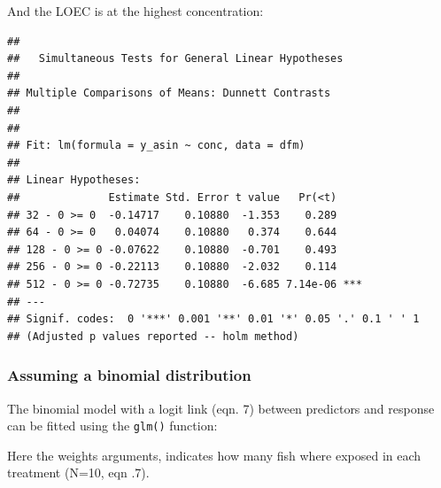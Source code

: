 And the LOEC is at the highest concentration:
\begin{knitrout}
\color{fgcolor}\small\begin{kframe}
\begin{alltt}
\hlstd{(}  \hlstd{=} \hlstd{(} \hlstd{=} \hlstd{),} 
                 \hlstd{=} \hlstd{),}
                 \hlstd{=} \hlstd{(}\hlstd{))}
\end{alltt}
\begin{verbatim}
## 
## 	 Simultaneous Tests for General Linear Hypotheses
## 
## Multiple Comparisons of Means: Dunnett Contrasts
## 
## 
## Fit: lm(formula = y_asin ~ conc, data = dfm)
## 
## Linear Hypotheses:
##              Estimate Std. Error t value   Pr(<t)    
## 32 - 0 >= 0  -0.14717    0.10880  -1.353    0.289    
## 64 - 0 >= 0   0.04074    0.10880   0.374    0.644    
## 128 - 0 >= 0 -0.07622    0.10880  -0.701    0.493    
## 256 - 0 >= 0 -0.22113    0.10880  -2.032    0.114    
## 512 - 0 >= 0 -0.72735    0.10880  -6.685 7.14e-06 ***
## ---
## Signif. codes:  0 '***' 0.001 '**' 0.01 '*' 0.05 '.' 0.1 ' ' 1
## (Adjusted p values reported -- holm method)
\end{verbatim}
\end{kframe}
\end{knitrout}


\subsubsection{Assuming a binomial distribution}
The binomial model with a logit link (eqn. 7) between predictors and response can be fitted using the \texttt{glm()} function:
\begin{knitrout}
\color{fgcolor}\small\begin{kframe}
\begin{alltt}
 \hlkwb{<-}  \hlopt{~}     \hlstd{=} \hlstd{(}\hlstd{=}\hlstd{),}
                   \hlstd{=} \hlstd{(}\hlstd{,} 
\end{alltt}
\end{kframe}
\end{knitrout}

Here the weights arguments, indicates how many fish where exposed in each treatment (N=10, eqn .7).

